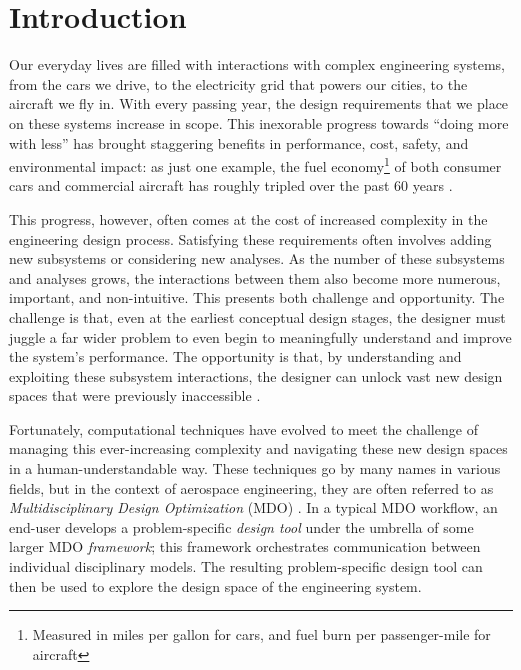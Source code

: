 \chapter{Introduction}
\label{chap:intro}


Our everyday lives are filled with interactions with complex engineering systems, from the cars we drive, to the electricity grid that powers our cities, to the aircraft we fly in. With every passing year, the design requirements that we place on these systems increase in scope. This inexorable progress towards ``doing more with less'' has brought staggering benefits in performance, cost, safety, and environmental impact: as just one example, the fuel economy\footnote{Measured in miles per gallon for cars, and fuel burn per passenger-mile for aircraft} of both consumer cars and commercial aircraft has roughly tripled over the past 60 years \cite{EPA_Automotive_Trends_2023, drela_tedx}.

This progress, however, often comes at the cost of increased complexity in the engineering design process. Satisfying these requirements often involves adding new subsystems or considering new analyses. As the number of these subsystems and analyses grows, the interactions between them also become more numerous, important, and non-intuitive. This presents both challenge and opportunity. The challenge is that, even at the earliest conceptual design stages, the designer must juggle a far wider problem to even begin to meaningfully understand and improve the system's performance. The opportunity is that, by understanding and exploiting these subsystem interactions, the designer can unlock vast new design spaces that were previously inaccessible \cite{drela_design_2011}.

Fortunately, computational techniques have evolved to meet the challenge of managing this ever-increasing complexity and navigating these new design spaces in a human-understandable way. These techniques go by many names in various fields, but in the context of aerospace engineering, they are often referred to as \emph{Multidisciplinary Design Optimization} (MDO) \cite{martins_multidisciplinary_2013}. In a typical MDO workflow, an end-user develops a problem-specific \emph{design tool} under the umbrella of some larger MDO \emph{framework}; this framework orchestrates communication between individual disciplinary models. The resulting problem-specific design tool can then be used to explore the design space of the engineering system.

